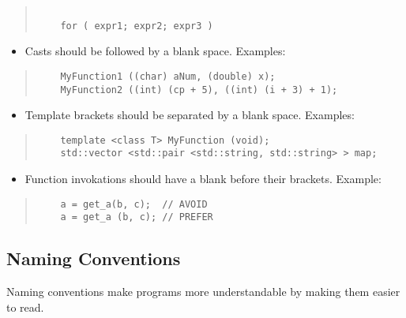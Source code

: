 \documentclass{article}
\begin{document}
\begin{quote}
\begin{verbatim}

    for ( expr1; expr2; expr3 )

\end{verbatim}
\end{quote}

\begin{itemize}
\item Casts should be followed by a blank space. Examples: 
\end{itemize}

\begin{quote}
\begin{verbatim}
    MyFunction1 ((char) aNum, (double) x);
    MyFunction2 ((int) (cp + 5), ((int) (i + 3) + 1);
\end{verbatim}
\end{quote}

\begin{itemize}
\item Template brackets should be separated by a blank space. Examples: 
\end{itemize}

\begin{quote}
\begin{verbatim}
    template <class T> MyFunction (void);
    std::vector <std::pair <std::string, std::string> > map;
\end{verbatim}
\end{quote}

\begin{itemize}
\item Function invokations should have a blank before their brackets.
Example:
\end{itemize}

\begin{quote}
\begin{verbatim}
    a = get_a(b, c);  // AVOID
    a = get_a (b, c); // PREFER
\end{verbatim}
\end{quote}

\subsection{Naming Conventions}

Naming conventions make programs more understandable by making them
easier to read.
\end{document}
